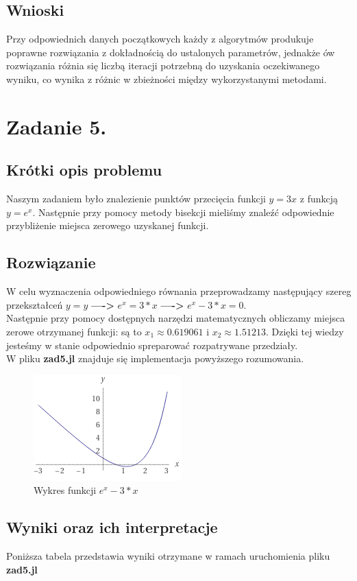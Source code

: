 \documentclass[a4paper,14pt]{report}
\begin{document}
  \section{Wnioski}
    Przy odpowiednich danych początkowych każdy z algorytmów produkuje poprawne rozwiązania z dokładnością do ustalonych parametrów, jednakże ów rozwiązania różnia się liczbą iteracji potrzebną do uzyskania oczekiwanego wyniku, co wynika z różnic w zbieżności między wykorzystanymi metodami.
\chapter{Zadanie 5.}
  \section{Krótki opis problemu}
    Naszym zadaniem było znalezienie punktów przecięcia funkcji $y=3x$ z funkcją $y=e^{x}$. Następnie przy pomocy metody bisekcji mieliśmy znaleźć odpowiednie przybliżenie miejsca zerowego uzyskanej funkcji.
  \section{Rozwiązanie}
    W celu wyznaczenia odpowiedniego równania przeprowadzamy następujący szereg przekształceń
    $y=y$ \textbf{---->} $e^{x}=3*x$ \textbf{---->} $e^{x}-3*x=0 $.\\
    Następnie przy pomocy dostępnych narzędzi matematycznych obliczamy miejsca zerowe otrzymanej funkcji: są to $x_{1} \approx 0.619061$ i $x_{2} \approx 1.51213 $. Dzięki tej wiedzy jesteśmy w stanie odpowiednio spreparować rozpatrywane przedziały. \\
    W pliku \textbf{zad5.jl} znajduje się implementacja powyższego rozumowania. 
    \begin{figure}[H]
      \includegraphics[scale=1.0]{zad5}
      \centering
      \caption{Wykres funkcji $e^{x}-3*x$}
    \end{figure}
  \section{Wyniki oraz ich interpretacje}
    Poniższa tabela przedstawia wyniki otrzymane w ramach uruchomienia pliku \textbf{zad5.jl} \\
\end{document}
